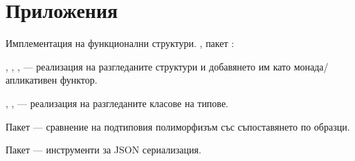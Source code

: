 \chapter*{Приложения}
\label{sec:attachments}

\begin{attachment}{Имплементация на функционални структури.}
  \label{att:fp}
  , пакет :
  
  \begin{itemize*}
    \item {}, , ,  — реализация на разгледаните структури и добавянето им като монада/апликативен функтор.
    
    \item {}, ,  — реализация на разгледаните класове на типове.
    
    \item Пакет  — сравнение на подтиповия полиморфизъм със съпоставянето по образци.
    
    \item Пакет  — инструменти за JSON сериализация.
  \end{itemize*}
\end{attachment}

